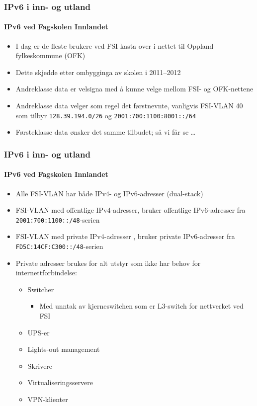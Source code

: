 \begin{frame}%
  \frametitle{IPv6 i inn- og utland}
  \framesubtitle{IPv6 ved Fagskolen Innlandet}
  \begin{itemize}%
  \item I dag er de fleste brukere ved FSI kasta over i nettet til
    Oppland fylkeskommune (OFK)
  \item Dette skjedde etter ombygginga av skolen i 2011--2012
  \item Andreklasse data er velsigna med å kunne velge mellom FSI- og
    OFK-nettene
  \item Andreklasse data velger som regel det førstnevnte, vanligvis
    FSI-VLAN 40 som tilbyr \texttt{128.39.194.0/26} og
    \texttt{2001:700:1100:8001::/64}
  \item Førsteklasse data ønsker det samme tilbudet; så vi får se \dots
  \end{itemize}
\end{frame}

\begin{frame}%
  \frametitle{IPv6 i inn- og utland}
  \framesubtitle{IPv6 ved Fagskolen Innlandet}
  \begin{itemize}%
  \item Alle FSI-VLAN har både IPv4- og IPv6-adresser (dual-stack)
  \item FSI-VLAN med offentlige IPv4-adresser, bruker offentlige
    IPv6-adresser fra \texttt{2001:700:1100::/48}-serien
  \item FSI-VLAN med private IPv4-adresser , bruker private
    IPv6-adresser fra \texttt{FD5C:14CF:C300::/48}-serien
  \item Private adresser brukes for alt utstyr som ikke har behov for
    internettforbindelse:
    \begin{itemize}%
    \item Switcher
      \begin{itemize}%
      \item Med unntak av kjerneswitchen som er L3-switch for
        nettverket ved FSI
      \end{itemize}
    \item UPS-er
    \item Lights-out management
    \item Skrivere
    \item Virtualiseringsservere
    \item VPN-klienter
    \end{itemize}
  \end{itemize}
\end{frame}

